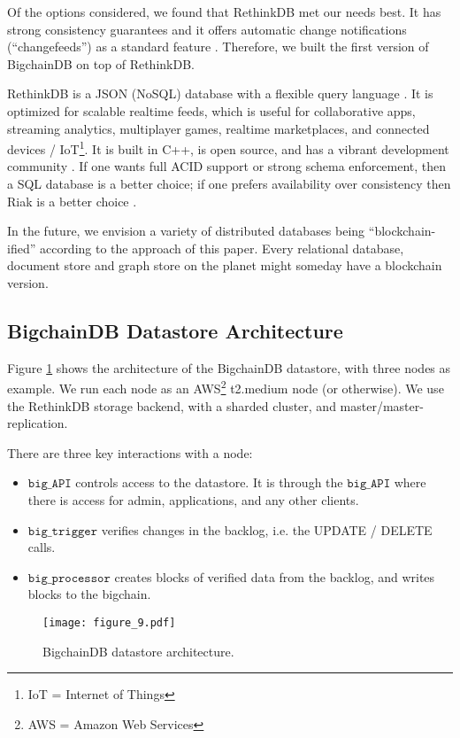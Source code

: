 Of the options considered, we found that RethinkDB met our needs best.
It has strong consistency guarantees \cite{rethinkdb_consistency} and it offers automatic change notifications (“changefeeds”) as a standard feature \cite{rethinkdb_changefeeds}.
Therefore, we built the first version of BigchainDB on top of RethinkDB.

RethinkDB is a JSON (NoSQL) database with a flexible query language \cite{rethinkdb_faq}.
It is optimized for scalable realtime feeds, which is useful for collaborative apps, streaming analytics, multiplayer games, realtime marketplaces, and connected devices / IoT\footnote{IoT = Internet of Things}.
It is built in C++, is open source, and has a vibrant development community \cite{rethinkdb_github}.
If one wants full ACID support or strong schema enforcement, then a SQL database is a better choice; if one prefers availability over consistency then Riak \cite{riak} is a better choice \cite{rethinkdb_faq}.

In the future, we envision a variety of distributed databases being “blockchain-ified” according to the approach of this paper.
Every relational database, document store and graph store on the planet might someday have a blockchain version.

\subsection{BigchainDB Datastore Architecture}
Figure \ref{fig:bigchaindb_datastore_architecture} shows the architecture of the BigchainDB datastore, with three nodes as example. 
We run each node as an AWS\footnote{AWS = Amazon Web Services} t2.medium node (or otherwise). 
We use the RethinkDB storage backend, with a sharded cluster, and master/master-replication.

\noindent There are three key interactions with a node:
\begin{itemize}
 \item $\mathtt{big\_API}$ controls access to the datastore. It is through the $\mathtt{big\_API}$ where there is access for admin, applications, and any other clients. 
 \item $\mathtt{big\_trigger}$ verifies changes in the backlog, i.e. the UPDATE / DELETE calls. 
 \item $\mathtt{big\_processor}$ creates blocks of verified data from the backlog, and writes blocks to the bigchain.
\end{itemize}

\begin{figure}[!ht]
  \centering
  \texttt{[image: figure\_9.pdf]}
  \caption{BigchainDB datastore architecture.}
  \label{fig:bigchaindb_datastore_architecture}
\end{figure}

